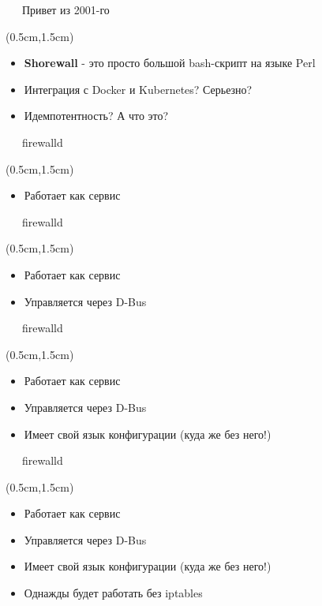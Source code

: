 \documentclass[xetex,18pt,aspectratio=43]{beamer}
\begin{document}
\begin{Large}
\begin{frame}{\ \ \ Привет из 2001-го}
\begin{textblock*}{\framewidth-0.8cm}(0.5cm,1.5cm)
\begin{itemize}
  \item {\bf Shorewall} - это просто большой bash-скрипт на языке Perl
  \item Интеграция с Docker и Kubernetes? Серьезно?
  \item Идемпотентность? А что это?
\end{itemize}
\end{textblock*}
\end{frame}

\begin{frame}{\ \ \ firewalld}
\begin{textblock*}{\framewidth-0.8cm}(0.5cm,1.5cm)
\begin{itemize}
  \item Работает как сервис
\end{itemize}
\end{textblock*}
\end{frame}

\begin{frame}{\ \ \ firewalld}
\begin{textblock*}{\framewidth-0.8cm}(0.5cm,1.5cm)
\begin{itemize}
  \item Работает как сервис
  \item Управляется через D-Bus
\end{itemize}
\end{textblock*}
\end{frame}

\begin{frame}{\ \ \ firewalld}
\begin{textblock*}{\framewidth-0.8cm}(0.5cm,1.5cm)
\begin{itemize}
  \item Работает как сервис
  \item Управляется через D-Bus
  \item Имеет свой язык конфигурации (куда же без него!)
\end{itemize}
\end{textblock*}
\end{frame}

\begin{frame}{\ \ \ firewalld}
\begin{textblock*}{\framewidth-0.8cm}(0.5cm,1.5cm)
\begin{itemize}
  \item Работает как сервис
  \item Управляется через D-Bus
  \item Имеет свой язык конфигурации (куда же без него!)
  \item Однажды будет работать без iptables
\end{itemize}
\end{textblock*}
\end{frame}


\end{Large}
\end{document}

